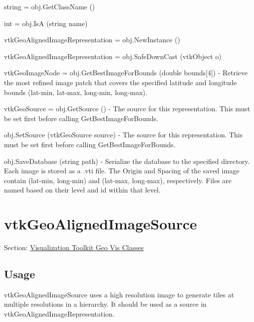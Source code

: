 \begin{DoxyItemize}
\item {\ttfamily string = obj.\-Get\-Class\-Name ()}  
\item {\ttfamily int = obj.\-Is\-A (string name)}  
\item {\ttfamily vtk\-Geo\-Aligned\-Image\-Representation = obj.\-New\-Instance ()}  
\item {\ttfamily vtk\-Geo\-Aligned\-Image\-Representation = obj.\-Safe\-Down\-Cast (vtk\-Object o)}  
\item {\ttfamily vtk\-Geo\-Image\-Node = obj.\-Get\-Best\-Image\-For\-Bounds (double bounds\mbox{[}4\mbox{]})} -\/ Retrieve the most refined image patch that covers the specified latitude and longitude bounds (lat-\/min, lat-\/max, long-\/min, long-\/max).  
\item {\ttfamily vtk\-Geo\-Source = obj.\-Get\-Source ()} -\/ The source for this representation. This must be set first before calling Get\-Best\-Image\-For\-Bounds.  
\item {\ttfamily obj.\-Set\-Source (vtk\-Geo\-Source source)} -\/ The source for this representation. This must be set first before calling Get\-Best\-Image\-For\-Bounds.  
\item {\ttfamily obj.\-Save\-Database (string path)} -\/ Serialize the database to the specified directory. Each image is stored as a .vti file. The Origin and Spacing of the saved image contain (lat-\/min, long-\/min) and (lat-\/max, long-\/max), respectively. Files are named based on their level and id within that level.  
\end{DoxyItemize}\hypertarget{vtkgeovis_vtkgeoalignedimagesource}{}\section{vtk\-Geo\-Aligned\-Image\-Source}\label{vtkgeovis_vtkgeoalignedimagesource}
Section\-: \hyperlink{sec_vtkgeovis}{Visualization Toolkit Geo Vis Classes} \hypertarget{vtkwidgets_vtkxyplotwidget_Usage}{}\subsection{Usage}\label{vtkwidgets_vtkxyplotwidget_Usage}
vtk\-Geo\-Aligned\-Image\-Source uses a high resolution image to generate tiles at multiple resolutions in a hierarchy. It should be used as a source in vtk\-Geo\-Aligned\-Image\-Representation.

